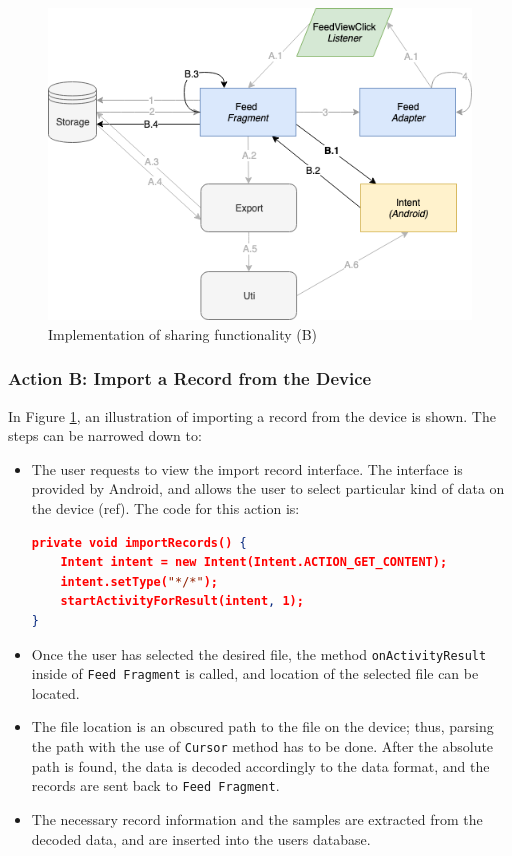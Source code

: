\begin{figure}
    \centering
    \includegraphics[scale=0.6]{images/Sharing_ImpB.png}
    \caption{Implementation of sharing functionality (B)}
    \label{fig:impl_sharingB}
\end{figure}

\subsubsection{Action B: Import a Record from the Device}
In Figure \ref{fig:impl_sharingB}, an illustration of importing a record from the device is shown. The steps can be narrowed down to:

\begin{itemize}
    \item[B.1] The user requests to view the import record interface. The interface is provided by Android, and allows the user to select particular kind of data on the device (ref). The code for this action is:
\begin{lstlisting}[language=json, caption={My Caption}, captionpos=b]
private void importRecords() {
    Intent intent = new Intent(Intent.ACTION_GET_CONTENT);
    intent.setType("*/*");
    startActivityForResult(intent, 1);
}

\end{lstlisting}
    \item[B.2] Once the user has selected the desired file, the method \verb|onActivityResult| inside of \verb|Feed Fragment| is called, and location of the selected file can be located. 
    \item[B.3] The file location is an obscured path to the file on the device; thus, parsing the path with the use of \verb|Cursor| method has to be done. After the absolute path is found, the data is decoded accordingly to the data format, and the records are sent back to \verb|Feed Fragment|.
    \item[B.4] The necessary record information and the samples are extracted from the decoded data, and are inserted into the users database. 
\end{itemize}


